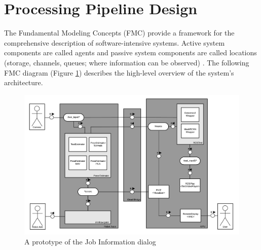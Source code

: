 \section{Processing Pipeline Design}\label{chap:3:architecture}
The Fundamental Modeling Concepts (FMC) provide a framework for the comprehensive description of software-intensive systems. 
Active system components are called agents and passive system components are called locations (storage, channels, queues; where information can be observed) \cite{FMCdiag}. The following FMC diagram (Figure \ref{fig:cow_fmc}) describes the high-level overview of the system's architecture.
    \begin{figure}[!ht]
        \centering
        \includegraphics[width=1\textwidth]{images/cow_fmc.png}
        \caption{A prototype of the Job Information dialog}
        \label{fig:cow_fmc}
    \end{figure}
    
